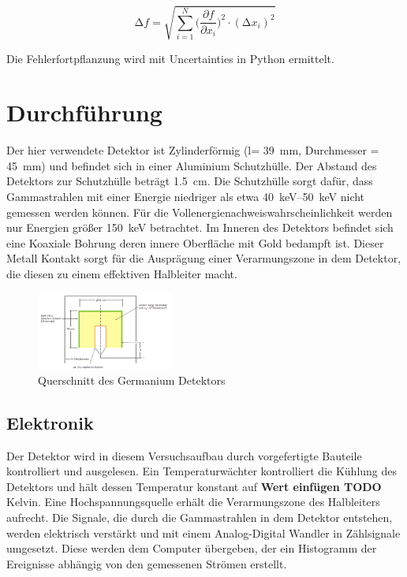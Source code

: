 \begin{equation}
	\increment{f} = \sqrt{ \sum_{i = 1}^{N}  \biggl(\frac{\partial{f}}{\partial{x_i}}\biggr)^2\cdot(\increment{x_i})^2}
	\label{eqn:Gauss}
\end{equation}

Die Fehlerfortpflanzung wird mit Uncertainties in Python \cite{uncertainties}
ermittelt.


\section{Durchführung \cite[vgl.][]{man:v18}}

Der hier verwendete Detektor ist Zylinderförmig (l= \qty{39}{\mm}, Durchmesser
= \qty{45}{\mm}) und befindet sich in einer Aluminium Schutzhülle. Der Abstand
des Detektors zur Schutzhülle beträgt \qty{1.5}{\cm}. Die Schutzhülle sorgt
dafür, dass Gammastrahlen mit einer Energie niedriger als etwa
\qtyrange{40}{50}{\keV} nicht gemessen werden können. Für die
Vollenergienachweiswahrscheinlichkeit werden nur Energien größer
\qty{150}{\keV} betrachtet. Im Inneren des Detektors befindet sich eine
Koaxiale Bohrung deren innere Oberfläche mit Gold bedampft ist. Dieser Metall
Kontakt sorgt für die Ausprägung einer Verarmungszone in dem Detektor, die
diesen zu einem effektiven Halbleiter macht.

\begin{figure}
	\centering
	\includegraphics[width=0.4\textwidth]{./Bilder/querschnitt_detektor.png}
	\caption{Querschnitt des Germanium Detektors}\label{fig:cross}
\end{figure}


\subsection{Elektronik}
Der Detektor wird in diesem Versuchsaufbau durch vorgefertigte Bauteile
kontrolliert und ausgelesen. Ein Temperaturwächter kontrolliert die Kühlung des
Detektors und hält dessen Temperatur konstant auf \textbf{Wert einfügen TODO}
Kelvin. Eine Hochspannungsquelle erhält die Verarmungszone des Halbleiters
aufrecht. Die Signale, die durch die Gammastrahlen in dem Detektor entstehen,
werden elektrisch verstärkt und mit einem Analog-Digital Wandler in Zählsignale
umgesetzt. Diese werden dem Computer übergeben, der ein Histogramm der
Ereignisse abhängig von den gemessenen Strömen erstellt.

